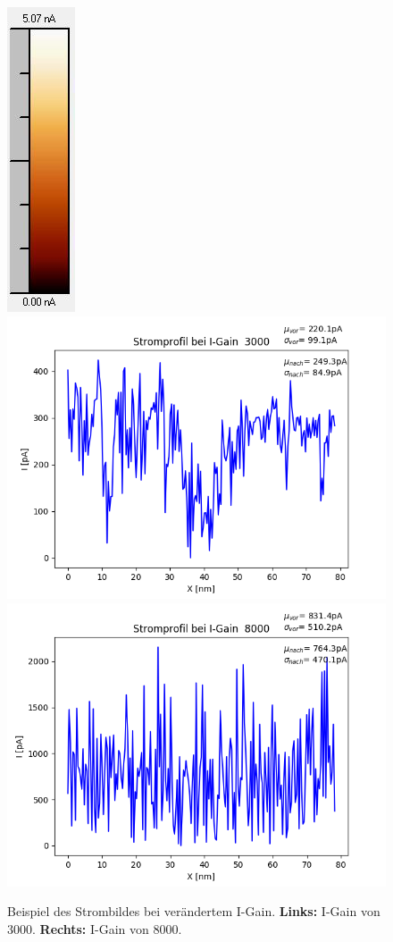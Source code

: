 \documentclass[12pt,a4paper]{article}
\begin{document}
\begin{figure}
\includegraphics[scale=0.6]{Bilder/Anhang/IGain/Strom/8000_IGain_Strom_vor_Skala.jpg}
\includegraphics[scale=0.5]{Bilder/Anhang/IGain/Strom/figure_1.png}
\includegraphics[scale=0.5]{Bilder/Anhang/IGain/Strom/figure_2.png}
\caption{Beispiel des Strombildes bei verändertem I-Gain. \textbf{Links:} I-Gain von 3000. \textbf{Rechts:} I-Gain von 8000.}
\label{fig:Strom}
\end{figure}
\end{document}
